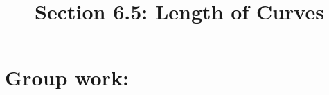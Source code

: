 \documentclass[noinstructornotes]{ximera}
\title{Section 6.5:  Length of Curves}
\begin{document}
\begin{abstract}		\end{abstract}
\maketitle



\begin{comment}
\section{Warm up:}

	\begin{freeResponse}
	
	\end{freeResponse}
	
\begin{instructorNotes}

\end{instructorNotes}
\end{comment}







\section{Group work:}
\end{document}
